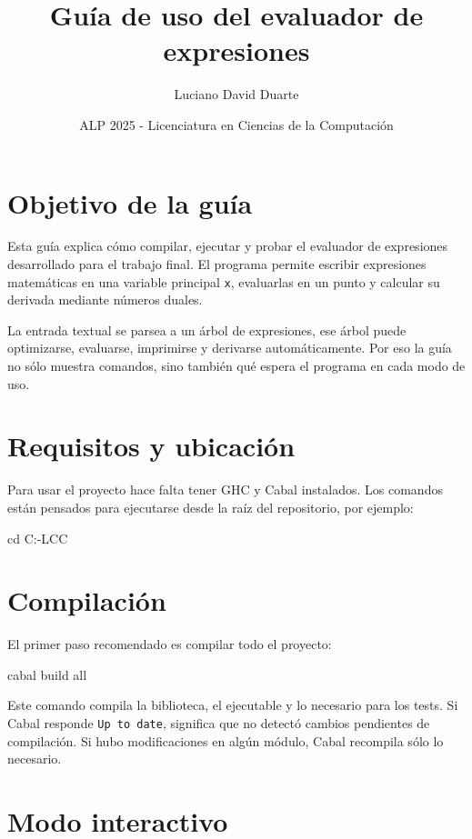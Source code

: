 \documentclass[11pt,a4paper]{article}
\title{Guía de uso del evaluador de expresiones}
\author{Luciano David Duarte}
\date{ALP 2025 - Licenciatura en Ciencias de la Computación}
\newenvironment{codeblock}{\verbatim}{\endverbatim}
\begin{document}
\maketitle

\section{Objetivo de la guía}

Esta guía explica cómo compilar, ejecutar y probar el evaluador de expresiones desarrollado para el trabajo final. El programa permite escribir expresiones matemáticas en una variable principal \texttt{x}, evaluarlas en un punto y calcular su derivada mediante números duales.

La entrada textual se parsea a un árbol de expresiones, ese árbol puede optimizarse, evaluarse, imprimirse y derivarse automáticamente. Por eso la guía no sólo muestra comandos, sino también qué espera el programa en cada modo de uso.

\section{Requisitos y ubicación}

Para usar el proyecto hace falta tener GHC y Cabal instalados. Los comandos están pensados para ejecutarse desde la raíz del repositorio, por ejemplo:

\begin{codeblock}
cd C:\Users\lucho{}-LCC
\end{codeblock}

\section{Compilación}

El primer paso recomendado es compilar todo el proyecto:

\begin{codeblock}
cabal build all
\end{codeblock}

Este comando compila la biblioteca, el ejecutable y lo necesario para los tests. Si Cabal responde \texttt{Up to date}, significa que no detectó cambios pendientes de compilación. Si hubo modificaciones en algún módulo, Cabal recompila sólo lo necesario.

\section{Modo interactivo}
\end{document}
